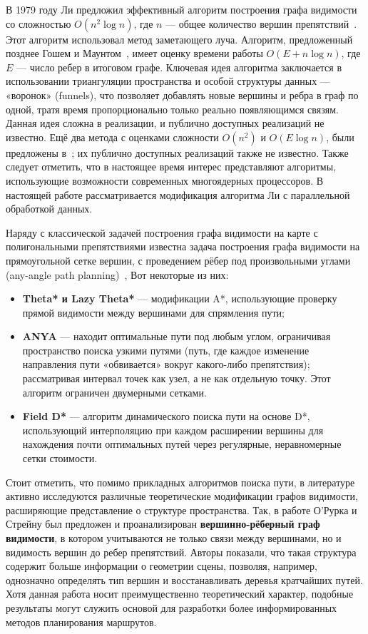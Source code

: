 \documentclass{article}
\theoremstyle{definition}
\begin{document}
В 1979 году Ли предложил эффективный алгоритм построения графа
видимости со сложностью $O(n^2 \log n)$, где $n$ --- общее количество
вершин препятствий~\cite{lee78,coleman2012visibility}.
Этот алгоритм использовал метод заметающего луча.
Алгоритм, предложенный позднее Гошем и Маунтом~\cite{ghosh87},
имеет оценку времени работы $O(E + n \log n)$, где $E$ — число ребер в итоговом графе.
Ключевая идея алгоритма заключается в
использовании триангуляции пространства и особой структуры данных —
«воронок» (funnels), что позволяет добавлять новые вершины и ребра в граф
по одной, тратя время пропорционально только реально появляющимся связям.
Данная идея сложна в реализации, и публично доступных реализаций не известно.
Ещё два метода с оценками сложности $O(n^2)$ и $O(E \log n)$, были предложены
в~\cite{OvermarsWelzl}; их публично доступных реализаций также не известно.
Также следует отметить, что в настоящее время интерес представляют
алгоритмы, использующие возможности современных многоядерных
процессоров. В настоящей работе рассматривается модификация алгоритма
Ли с параллельной обработкой данных.

Наряду с классической задачей построения графа видимости на карте с
полигональными препятствиями известна задача построения графа
видимости на прямоугольной сетке вершин, с проведением рёбер под
произвольными углами (any-angle path
planning)~\cite{nash07theta,nash10lazy,harabor16anya}, Вот некоторые
из них:

\begin{itemize}
    \item \textbf{Theta* и Lazy Theta*} --- модификации A*, использующие проверку 
    прямой видимости между вершинами для спрямления пути;
    \item \textbf{ANYA} --- находит оптимальные пути под любым углом, ограничивая пространство поиска узкими путями 
        (путь, где каждое изменение направления пути «обвивается» вокруг какого-либо препятствия); 
        рассматривая интервал точек как узел, а не как отдельную точку. 
        Этот алгоритм ограничен двумерными сетками.
    \item \textbf{Field D*} --- алгоритм динамического поиска пути на основе D*, 
        использующий интерполяцию при каждом расширении вершины для нахождения почти оптимальных путей через регулярные, 
        неравномерные сетки стоимости.
\end{itemize}

Стоит отметить, что помимо прикладных алгоритмов поиска пути, в литературе активно исследуются
различные теоретические модификации графов видимости, расширяющие представление о структуре пространства.
Так, в работе О'Рурка и Стрейну \cite{orourke98vertexedge} был предложен и проанализирован
\textbf{вершинно-рёберный граф видимости}, в котором учитываются не только связи между вершинами,
но и видимость вершин до ребер препятствий. Авторы показали, что такая структура содержит больше
информации о геометрии сцены, позволяя, например, однозначно определять тип вершин и восстанавливать
деревья кратчайших путей. Хотя данная работа носит преимущественно теоретический характер,
подобные результаты могут служить основой для разработки более информированных методов планирования маршрутов.
\end{document}
